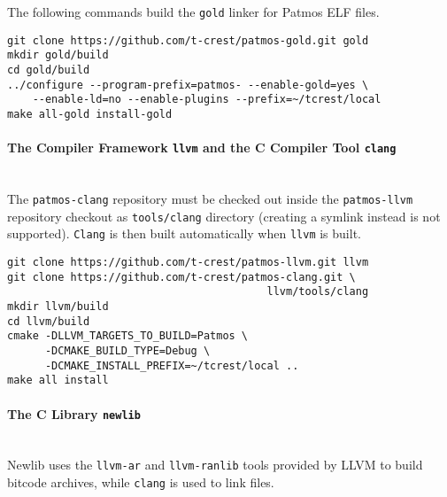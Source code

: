 The following commands build the \texttt{gold} linker for Patmos ELF files.
\begin{verbatim}
git clone https://github.com/t-crest/patmos-gold.git gold
mkdir gold/build
cd gold/build
../configure --program-prefix=patmos- --enable-gold=yes \
    --enable-ld=no --enable-plugins --prefix=~/tcrest/local
make all-gold install-gold
\end{verbatim}


\paragraph{The Compiler Framework \texttt{llvm} and the C Compiler Tool \texttt{clang}} \hfill\\

The \texttt{patmos-clang} repository must be checked out inside the \texttt{patmos-llvm} repository checkout as
\texttt{tools/clang} directory (creating a symlink instead is not supported). 
\texttt{Clang} is then built automatically when \texttt{llvm} is built.

\begin{verbatim}
git clone https://github.com/t-crest/patmos-llvm.git llvm
git clone https://github.com/t-crest/patmos-clang.git \
                                         llvm/tools/clang
mkdir llvm/build
cd llvm/build
cmake -DLLVM_TARGETS_TO_BUILD=Patmos \
      -DCMAKE_BUILD_TYPE=Debug \
      -DCMAKE_INSTALL_PREFIX=~/tcrest/local ..
make all install
\end{verbatim}


\paragraph{The C Library \texttt{newlib}} \hfill\\

Newlib uses the \texttt{llvm-ar} and \texttt{llvm-ranlib} tools provided by LLVM to build bitcode 
archives, while \texttt{clang} is used to link files. 

